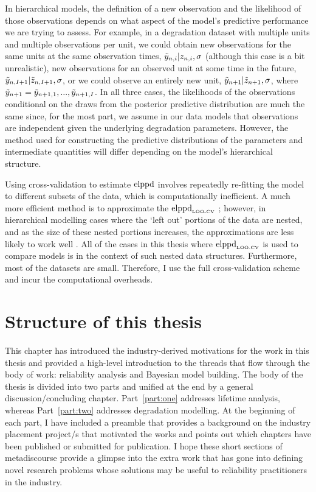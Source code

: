 In hierarchical models, the definition of a new observation and the likelihood of those observations depends on what aspect of the model's predictive performance we are trying to assess. For example, in a degradation dataset with multiple units and multiple observations per unit, we could obtain new observations for the same units at the same observation times, $\Tilde{y}_{n,i} | z_{n, i}, \sigma$ (although this case is a bit unrealistic), new observations for an observed unit at some time in the future, $\Tilde{y}_{n, I + 1}|\Tilde{z}_{n, I + 1}, \sigma$, or we could observe an entirely new unit, $\Tilde{y}_{n + 1}|\Tilde{z}_{n + 1}, \sigma$, where $\Tilde{y}_{n + 1} = {\Tilde{y}_{n + 1, 1}, ..., \Tilde{y}_{n + 1, I}}$. In all three cases, the likelihoods of the observations conditional on the draws from the posterior predictive distribution are much the same since, for the most part, we assume in our data models that observations are independent given the underlying degradation parameters. However, the method used for constructing the predictive distributions of the parameters and intermediate quantities will differ depending on the model's hierarchical structure.

Using cross-validation to estimate $\hbox{elppd}$ involves repeatedly re-fitting the model to different subsets of the data, which is computationally inefficient. A much more efficient method is to approximate the $\hbox{elppd}_{\text{\tiny{LOO-CV}}}$ \citep{Vehtari2017}; however, in hierarchical modelling cases where the `left out' portions of the data are nested, and as the size of these nested portions increases, the approximations are less likely to work well \citep{Vehtari2017}. All of the cases in this thesis where $\hbox{elppd}_{\text{\tiny{LOO-CV}}}$ is used to compare models is in the context of such nested data structures. Furthermore, most of the datasets are small. Therefore, I use the full cross-validation scheme and incur the computational overheads.

\section{Structure of this thesis}
\label{sec:thesis-structure}

This chapter has introduced the industry-derived motivations for the work in this thesis and provided a high-level introduction to the threads that flow through the body of work: reliability analysis and Bayesian model building. The body of the thesis is divided into two parts and unified at the end by a general discussion/concluding chapter. Part~\ref{part:one} addresses lifetime analysis, whereas Part~\ref{part:two} addresses degradation modelling. At the beginning of each part, I have included a preamble that provides a background on the industry placement project/s that motivated the works and points out which chapters have been published or submitted for publication. I hope these short sections of metadiscourse provide a glimpse into the extra work that has gone into defining novel research problems whose solutions may be useful to reliability practitioners in the industry.

